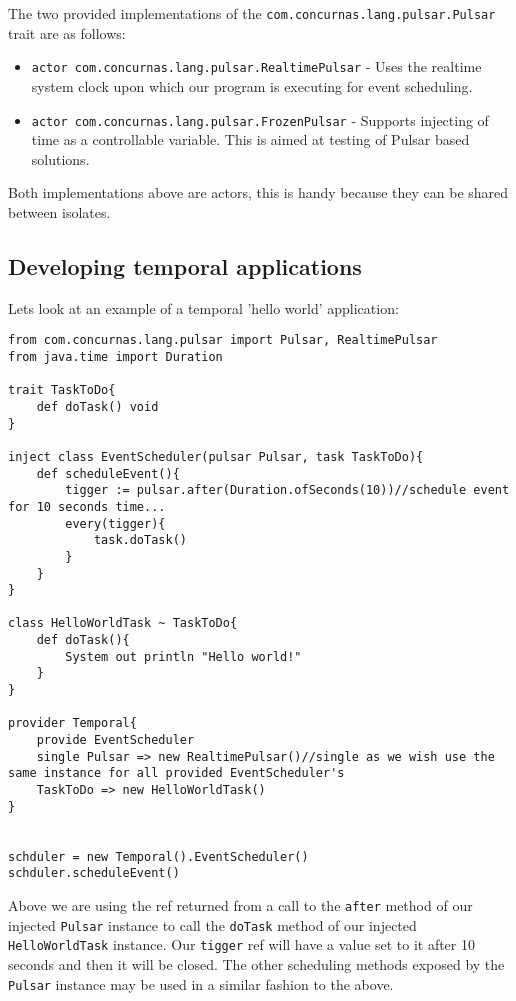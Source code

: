 \documentclass[conc-doc]{subfiles}
\begin{document}
The two provided implementations of the \lstinline{com.concurnas.lang.pulsar.Pulsar} trait are as follows:

\begin{itemize}
	\item \lstinline{actor com.concurnas.lang.pulsar.RealtimePulsar} - Uses the realtime system clock upon which our program is executing for event scheduling.
	\item \lstinline{actor com.concurnas.lang.pulsar.FrozenPulsar} - Supports injecting of time as a controllable variable. This is aimed at testing of Pulsar based solutions.
\end{itemize}

Both implementations above are actors, this is handy because they can be shared between isolates.

\subsection{Developing temporal applications}
Lets look at an example of a temporal 'hello world' application:

\begin{lstlisting}
from com.concurnas.lang.pulsar import Pulsar, RealtimePulsar
from java.time import Duration

trait TaskToDo{
	def doTask() void
}

inject class EventScheduler(pulsar Pulsar, task TaskToDo){
	def scheduleEvent(){
		tigger := pulsar.after(Duration.ofSeconds(10))//schedule event for 10 seconds time...
		every(tigger){
			task.doTask()
		}
	}
}

class HelloWorldTask ~ TaskToDo{
	def doTask(){
		System out println "Hello world!"
	}
}

provider Temporal{
	provide EventScheduler
	single Pulsar => new RealtimePulsar()//single as we wish use the same instance for all provided EventScheduler's
	TaskToDo => new HelloWorldTask()
}


schduler = new Temporal().EventScheduler()
schduler.scheduleEvent()

\end{lstlisting}

Above we are using the ref returned from a call to the \lstinline{after} method of our injected \lstinline{Pulsar} instance to call the \lstinline{doTask} method of our injected \lstinline{HelloWorldTask} instance. Our \lstinline{tigger} ref will have a value set to it after 10 seconds and then it will be closed. The other scheduling methods exposed by the \lstinline{Pulsar} instance may be used in a similar fashion to the above.
\end{document}
